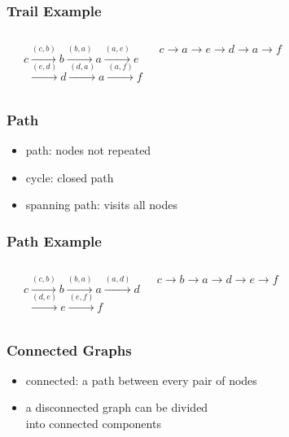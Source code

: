 \documentclass[dvipsnames]{beamer}
\begin{document}
\begin{frame}
  \frametitle{Trail Example}

  \begin{columns}
    \begin{center}
    \end{center}

    $c \xrightarrow{(c,b)} b \xrightarrow{(b,a)} a \xrightarrow{(a,e)} e$\\
    $~~\xrightarrow{(e,d)} d \xrightarrow{(d,a)} a \xrightarrow{(a,f)} f$

    \medskip
    $c \rightarrow a \rightarrow e \rightarrow d \rightarrow a
        \rightarrow f$
  \end{columns}
\end{frame}

\begin{frame}
  \frametitle{Path}

  \begin{itemize}
    \item \alert{path}: nodes not repeated
    \item \alert{cycle}: closed path
    \item \alert{spanning} path: visits all nodes
  \end{itemize}
\end{frame}

\begin{frame}
  \frametitle{Path Example}

  \begin{columns}
    \begin{center}
    \end{center}

    $c \xrightarrow{(c,b)} b \xrightarrow{(b,a)} a \xrightarrow{(a,d)} d$\\
    $~~\xrightarrow{(d,e)} e \xrightarrow{(e,f)} f$

    \medskip
    $c \rightarrow b \rightarrow a \rightarrow d \rightarrow e \rightarrow f$
  \end{columns}
\end{frame}

\begin{frame}
  \frametitle{Connected Graphs}

  \begin{itemize}
    \item \alert{connected}: a path between every pair of nodes
    \item a disconnected graph can be divided\\
      into connected components
  \end{itemize}
\end{frame}
\end{document}
